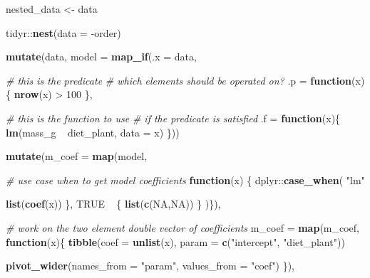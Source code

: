 \documentclass[]{book}
\newenvironment{Shaded}{}{}
\newcommand{\CommentTok}[1]{\textcolor[rgb]{0.38,0.63,0.69}{\textit{#1}}}
\newcommand{\ControlFlowTok}[1]{\textcolor[rgb]{0.00,0.44,0.13}{\textbf{#1}}}
\newcommand{\DataTypeTok}[1]{\textcolor[rgb]{0.56,0.13,0.00}{#1}}
\newcommand{\DecValTok}[1]{\textcolor[rgb]{0.25,0.63,0.44}{#1}}
\newcommand{\KeywordTok}[1]{\textcolor[rgb]{0.00,0.44,0.13}{\textbf{#1}}}
\newcommand{\NormalTok}[1]{#1}
\newcommand{\OperatorTok}[1]{\textcolor[rgb]{0.40,0.40,0.40}{#1}}
\newcommand{\OtherTok}[1]{\textcolor[rgb]{0.00,0.44,0.13}{#1}}
\newcommand{\StringTok}[1]{\textcolor[rgb]{0.25,0.44,0.63}{#1}}
\begin{document}
\begin{Shaded}
\begin{Highlighting}[]
\NormalTok{nested_data <-}
\StringTok{  }\NormalTok{data }\OperatorTok{%
\StringTok{  }\NormalTok{tidyr}\OperatorTok{::}\KeywordTok{nest}\NormalTok{(}\DataTypeTok{data =} \OperatorTok{-}\NormalTok{order) }\OperatorTok{%
\StringTok{  }\KeywordTok{mutate}\NormalTok{(data,}
         \DataTypeTok{model =} \KeywordTok{map_if}\NormalTok{(}\DataTypeTok{.x =}\NormalTok{ data,}

                        \CommentTok{# this is the predicate}
                        \CommentTok{# which elements should be operated on?}
                        \DataTypeTok{.p =} \ControlFlowTok{function}\NormalTok{(x)\{}
                          \KeywordTok{nrow}\NormalTok{(x) }\OperatorTok{>}\StringTok{ }\DecValTok{100}
\NormalTok{                        \},}

                        \CommentTok{# this is the function to use}
                        \CommentTok{# if the predicate is satisfied}
                        \DataTypeTok{.f =} \ControlFlowTok{function}\NormalTok{(x)\{}
                          \KeywordTok{lm}\NormalTok{(mass_g }\OperatorTok{~}\StringTok{ }\NormalTok{diet_plant, }\DataTypeTok{data =}\NormalTok{ x)}
\NormalTok{                        \})) }\OperatorTok{%

\StringTok{  }\KeywordTok{mutate}\NormalTok{(}\DataTypeTok{m_coef =} \KeywordTok{map}\NormalTok{(model,}

                      \CommentTok{# use case when to get model coefficients}
                      \ControlFlowTok{function}\NormalTok{(x) \{}
\NormalTok{                        dplyr}\OperatorTok{::}\KeywordTok{case_when}\NormalTok{(}
                          \StringTok{"lm"} \OperatorTok{%
                            \KeywordTok{list}\NormalTok{(}\KeywordTok{coef}\NormalTok{(x))}
\NormalTok{                          \},}
                          \OtherTok{TRUE} \OperatorTok{~}\StringTok{ }\NormalTok{\{}
                            \KeywordTok{list}\NormalTok{(}\KeywordTok{c}\NormalTok{(}\OtherTok{NA}\NormalTok{,}\OtherTok{NA}\NormalTok{))}
\NormalTok{                          \}}
\NormalTok{                        )\}),}

         \CommentTok{# work on the two element double vector of coefficients}
         \DataTypeTok{m_coef =} \KeywordTok{map}\NormalTok{(m_coef, }\ControlFlowTok{function}\NormalTok{(x)\{}
           \KeywordTok{tibble}\NormalTok{(}\DataTypeTok{coef =} \KeywordTok{unlist}\NormalTok{(x),}
                  \DataTypeTok{param =} \KeywordTok{c}\NormalTok{(}\StringTok{"intercept"}\NormalTok{, }\StringTok{"diet_plant"}\NormalTok{)) }\OperatorTok{%
\StringTok{             }\KeywordTok{pivot_wider}\NormalTok{(}\DataTypeTok{names_from =} \StringTok{"param"}\NormalTok{,}
                         \DataTypeTok{values_from =} \StringTok{"coef"}\NormalTok{)}
\NormalTok{         \}),}

}}}}}
\end{Highlighting}
\end{Shaded}
\end{document}
